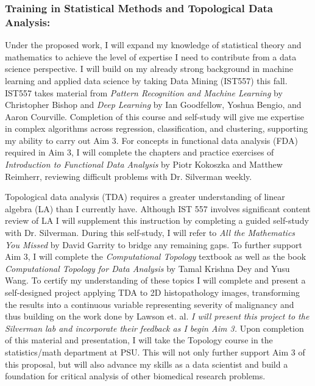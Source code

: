 \documentclass{NIHGrant}
\begin{document}
\subsubsection*{Training in Statistical Methods and Topological Data Analysis:}
Under the proposed work, I will expand my knowledge of statistical theory and mathematics to achieve the level of expertise I need to contribute from a data science perspective. I will build on my already strong background in machine learning and applied data science by taking Data Mining (IST557) this fall. IST557 takes material from \textit{Pattern Recognition and Machine Learning} by Christopher Bishop and \textit{Deep Learning} by Ian Goodfellow, Yoshua Bengio, and Aaron Courville. Completion of this course and self-study will give me expertise in complex algorithms across regression, classification, and clustering, supporting my ability to carry out Aim 3. For concepts in functional data analysis (FDA) required in Aim 3, I will complete the chapters and practice exercises of \textit{Introduction to Functional Data Analysis} by Piotr Kokoszka and Matthew Reimherr, reviewing difficult problems with Dr. Silverman weekly.

Topological data analysis (TDA) requires a greater understanding of linear algebra (LA) than I currently have. Although IST 557 involves significant content review of LA I will supplement this instruction by completing a guided self-study with Dr. Silverman. During this self-study, I will refer to \textit{All the Mathematics You Missed} by David Garrity to bridge any remaining gaps. To further support Aim 3, I will complete the \textit{Computational Topology} textbook as well as the book \textit{Computational Topology for Data Analysis} by Tamal Krishna Dey and Yusu Wang. To certify my understanding of these topics I will complete and present a self-designed project applying TDA to 2D histopathology images, transforming the results into a continuous variable representing severity of malignancy and thus building on the work done by Lawson et. al. \emph{I will present this project to the Silverman lab and incorporate their feedback as I begin Aim 3.} Upon completion of this material and presentation, I will take the Topology course in the statistics/math department at PSU. This will not only further support Aim 3 of this proposal, but will also advance my skills as a data scientist and build a foundation for critical analysis of other biomedical research problems.
\end{document}
